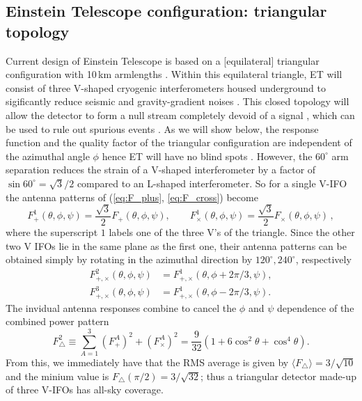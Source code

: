 \documentclass[amsmath,amssymb,aps,floats,amsfonts,notitlepage,superscriptaddress,eqsecnum,nofootinbib,10pt]{revtex4-1}
\newcommand{\f}{\frac}
\newcommand{\be}{\begin{equation}}
\newcommand{\ee}{\end{equation}}
\begin{document}
\subsection{Einstein Telescope configuration: triangular topology}\label{sec:ET_topo}
Current design of Einstein Telescope is based on a [equilateral] triangular configuration with 10\,km armlengths \cite{ET_doc}.
Within this equilateral triangle, ET will consist of three V-shaped cryogenic interferometers housed underground to
sigificantly reduce seismic and gravity-gradient noises \cite{ET_doc}.
This closed topology will allow the detector to form a null stream completely devoid of a signal \cite{Sathyaprakash:2012jk},
which can be used to rule out spurious events \cite{Wen:2005ui}.
As we will show below, the response function and the quality factor of the triangular configuration are independent of the azimuthal angle $\phi$
hence ET will have no blind spots \cite{Regimbau:2012ir}.
However, the $60^\circ$ arm separation reduces the strain of a V-shaped interferometer by a factor of $\sin 60^\circ=\sqrt{3}/2$ compared
to an L-shaped interferometer. So for a single V-IFO the antenna patterns of (\ref{eq:F_plus}, \ref{eq:F_cross}) become
%
\be
F^1_+(\theta,\phi,\psi)= \f{\sqrt{3}}{2} F_+(\theta,\phi,\psi), \qquad F^1_\times(\theta,\phi,\psi)= \f{\sqrt{3}}{2} F_\times(\theta,\phi,\psi)\label{eq:F1plus_F1cross}\, ,
\ee
%
where the superscript $1$ labels one of the three V's of the triangle.
Since the other two V IFOs lie in the same plane as the first one, their antenna patterns can be obtained simply by rotating in the azimuthal
direction by $120^\circ, 240^\circ$, respectively
%
\begin{align}
 F^2_{+,\times}(\theta,\phi,\psi) &= F^1_{+,\times}(\theta,\phi+2\pi/3,\psi), \label{eq:F2plus_F2cross}\\
 F^3_{+,\times}(\theta,\phi,\psi) &= F^1_{+,\times}(\theta,\phi-2\pi/3,\psi) \label{eq:F3plus_F3cross}.
\end{align}
%
The invidual antenna responses combine to cancel the $\phi$ and $\psi$ dependence of the combined power pattern
%
\be
F^2_\bigtriangleup \equiv \sum_{A=1}^3 \left(F^A_+\right)^2+\left(F^A_\times\right)^2 = \f{9}{32}\left(1+6\cos^2\theta + \cos^4\theta\right). \label{eq:ET_power_pattern}
\ee
%
From this, we immediately have that the RMS average is given by $\langle F_\bigtriangleup\rangle =3/\sqrt{10}$ and the minium value is $F_\bigtriangleup(\pi/2)=3/\sqrt{32}$;
thus a triangular detector made-up of three V-IFOs has all-sky coverage.
\end{document}
